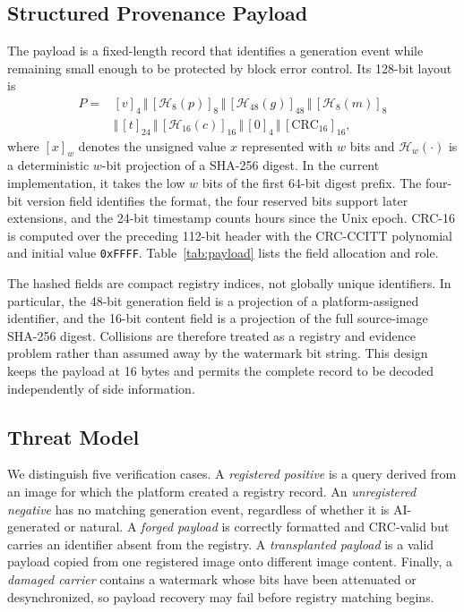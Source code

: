 \documentclass[a4paper,fleqn]{cas-sc}
\begin{document}
\subsection{Structured Provenance Payload}
The payload is a fixed-length record that identifies a generation event while
remaining small enough to be protected by block error control. Its 128-bit
layout is
\begin{equation}
\begin{aligned}
P={}&[v]_4\,\Vert\,[\mathcal{H}_8(p)]_8\,\Vert\,
[\mathcal{H}_{48}(g)]_{48}\,\Vert\,[\mathcal{H}_8(m)]_8\\
&\Vert\,[t]_{24}\,\Vert\,
[\mathcal{H}_{16}(c)]_{16}\,\Vert\,[0]_4\,\Vert\,[\mathrm{CRC}_{16}]_{16},
\end{aligned}
\label{eq:payload-layout}
\end{equation}
where $[x]_w$ denotes the unsigned value $x$ represented with $w$ bits and
$\mathcal{H}_w(\cdot)$ is a deterministic $w$-bit projection of a SHA-256
digest. In the current implementation, it takes the low $w$ bits of the first
64-bit digest prefix.
The four-bit version field identifies the format, the four reserved bits
support later extensions, and the 24-bit timestamp counts hours since the Unix
epoch. CRC-16 is computed over the preceding 112-bit header with the CRC-CCITT
polynomial and initial value \texttt{0xFFFF}. Table~\ref{tab:payload} lists the
field allocation and role.

The hashed fields are compact registry indices, not globally unique
identifiers. In particular, the 48-bit generation field is a projection of a
platform-assigned identifier, and the 16-bit content field is a projection of
the full source-image SHA-256 digest. Collisions are therefore treated as a
registry and evidence problem rather than assumed away by the watermark bit
string. This design keeps the payload at 16 bytes and permits the complete
record to be decoded independently of side information.


\subsection{Threat Model}
We distinguish five verification cases. A \emph{registered positive} is a
query derived from an image for which the platform created a registry record.
An \emph{unregistered negative} has no matching generation event, regardless
of whether it is AI-generated or natural. A \emph{forged payload} is correctly
formatted and CRC-valid but carries an identifier absent from the registry. A
\emph{transplanted payload} is a valid payload copied from one registered image
onto different image content. Finally, a \emph{damaged carrier} contains a
watermark whose bits have been attenuated or desynchronized, so payload
recovery may fail before registry matching begins.
\end{document}
